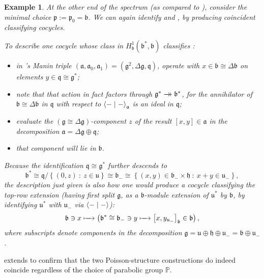 \documentclass[11pt,leqno]{article}
\theoremstyle{plain}
\theoremstyle{plain}
\theoremstyle{plain}
\newtheorem{example}[lemma]{Example}
\numberwithin{equation}{section}
\theoremstyle{nonumberplain}
\newcommand\bP{{\mathbb P}}
\newcommand\fa{{\mathfrak a}}
\newcommand\fb{{\mathfrak b}}
\newcommand\fg{{\mathfrak g}}
\newcommand\fh{{\mathfrak h}}
\newcommand\fp{{\mathfrak p}}
\newcommand\fq{{\mathfrak q}}
\newcommand\fu{{\mathfrak u}}
\newcommand\1{{\bf 1}}
\newcommand{\xrightarrowdbl}[2][]{%
  \xrightarrow[#1]{#2}\mathrel{\mkern-14mu}\rightarrow
}
\begin{document}
\begin{example}\label{ex:pb}  
  At the other end of the spectrum (as compared to ), consider the minimal choice $\fp:=\fp_0=\fb$. We can again identify  and , by producing coincident classifying cocycles. 

  To describe one cocycle whose class in $H^1_{\fb}(\fb^*,\fb)$ classifies :
  \begin{itemize}[wide]
  \item in 's Manin triple $(\fa,\fa_0,\fa_1)=\left(\fg^2,\Delta\fg,\fq\right)$, operate with $x\in \fb\cong \Delta\fb$ on elements $y\in \fq\cong \fg^*$;
  \item note that that action in fact factors through $\fg^*\xrightarrowdbl{}\fb^*$, for the annihilator of $\fb\cong \Delta\fb$ in $\fq$ with respect to $\Braket{-\mid -}_{\fa}$ is an ideal in $\fq$;
  \item evaluate the $\left(\fg\cong \Delta\fg\right)$-component $z$ of the result $[x,y]\in \fa$ in the decomposition $\fa=\Delta\fg\oplus \fq$;
  \item that component will lie in $\fb$. 
  \end{itemize}
  Because the identification $\fq\cong \fg^*$ further descends to
  \begin{equation*}
    \fb^*
    \cong
    \fq/\left\{(0,z)\ :\ z\in \fu\right\}
    \cong
    \fb_{-}
    \cong
    \left\{(x,y)\in \fb_{-}\times \fh\ :\ x+y\in \fu_{-}\right\},
  \end{equation*}
  the description just given is also how one would produce a cocycle classifying the top-row extension  (having first split $\fg$, as a $\fb$-module extension of $\fu^*$ by $\fb$, by identifying $\fu^*$ with $\fu_{-}$ via $\Braket{-\mid -}$):
  \begin{equation*}
    \fb\ni x
    \xmapsto{\quad}
    \left(
      \fb^*\cong \fb_{-}\ni y
      \xmapsto{\quad}
      \left[x,y_{\fu_{-}}\right]_{\fb}
      \in \fb
    \right),
  \end{equation*}
  where subscripts denote components in the decomposition $\fg=\fu\oplus \fh\oplus \fu_{-}=\fb\oplus \fu_{-}$. 
\end{example}

 extends to confirm that the two Poisson-structure constructions do indeed coincide regardless of the choice of parabolic group $\bP$. 
\end{document}
